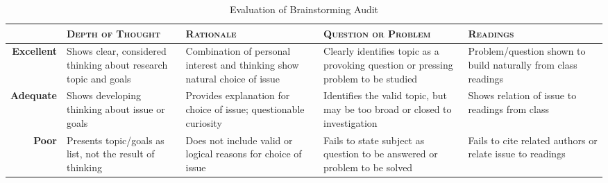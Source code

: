 \documentclass[12pt,oneside]{amsart}	%
\begin{document}
\begin{table}[b]
	\caption{Evaluation of Brainstorming Audit}\label{tab:rubric}
\begin{tabulary}{\textwidth}{rLLLL}
	\toprule  & \textbf{\textsc{Depth of Thought}} & \textbf{\textsc{Rationale}} & \textbf{\textsc{Question or Problem}} & \textbf{\textsc{Readings}}\\
\midrule	\textbf{Excellent} & Shows clear, considered thinking about research topic and goals & Combination of personal interest and thinking show natural choice of issue & Clearly identifies topic as a provoking question or pressing problem to be studied & Problem/question shown to build naturally from class readings \\
\midrule	\textbf{Adequate} & Shows developing thinking about issue or goals & Provides explanation for choice of issue; questionable curiosity & Identifies the valid topic, but may be too broad or closed to investigation & Shows relation of issue to readings from class \\
\midrule	\textbf{Poor} & Presents topic/goals as list, not the result of thinking & Does not include valid or logical reasons for choice of issue & Fails to state subject as question to be answered or problem to be solved & Fails to cite related authors or relate issue to readings \\
	\bottomrule
\end{tabulary}
\end{table}

\begin{comment}
	\section{Formatting} %
	\label{sec:formatting}
	While this document isn't your typical formal research report, you should get in the habit of formatting your documents to meet the guidelines of an appropriate style, such as the \textsc{mla} or \textsc{apa}. An \textsc{mla}-formatted template is available from Webcourses. Regardless, be sure your document meets these requirements:
	\begin{itemize}
		\item double-spaced lines,
		\item one-inch margins on all sides and half-inch indents for paragraphs,
		\item a 12-point typeface with serifs (like Times New Roman, \emph{not} Calibri), and
		\item parenthetical citations and a Works Cited or References page, as appropriate.
	\end{itemize}
\end{comment}
\end{document}
